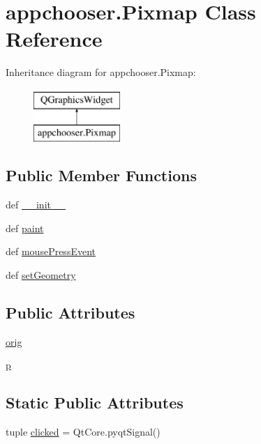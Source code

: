 \hypertarget{classappchooser_1_1Pixmap}{}\section{appchooser.\+Pixmap Class Reference}
\label{classappchooser_1_1Pixmap}
Inheritance diagram for appchooser.\+Pixmap\+:\begin{figure}[H]
\begin{center}
\leavevmode
\includegraphics[height=2.000000cm]{classappchooser_1_1Pixmap}
\end{center}
\end{figure}
\subsection*{Public Member Functions}
\begin{DoxyCompactItemize}
\item 
def \hyperlink{classappchooser_1_1Pixmap_acabb2861b1d8603b8b3d1a4b4c00944c}{\+\_\+\+\_\+init\+\_\+\+\_\+}
\item 
def \hyperlink{classappchooser_1_1Pixmap_a69586a670437270874359948265b95b1}{paint}
\item 
def \hyperlink{classappchooser_1_1Pixmap_aa87f89d521f49a163d54d85947897b25}{mouse\+Press\+Event}
\item 
def \hyperlink{classappchooser_1_1Pixmap_a3e407835b89aca24e9b58ac8d80c6afd}{set\+Geometry}
\end{DoxyCompactItemize}
\subsection*{Public Attributes}
\begin{DoxyCompactItemize}
\item 
\hyperlink{classappchooser_1_1Pixmap_a01b697e17945b980d79ba12256fecf80}{orig}
\item 
\hyperlink{classappchooser_1_1Pixmap_ae22103fc2e83348f7b4f34818931e74f}{p}
\end{DoxyCompactItemize}
\subsection*{Static Public Attributes}
\begin{DoxyCompactItemize}
\item 
tuple \hyperlink{classappchooser_1_1Pixmap_a0a9f5639abea7ce94a18af8593db2109}{clicked} = Qt\+Core.\+pyqt\+Signal()
\end{DoxyCompactItemize}


